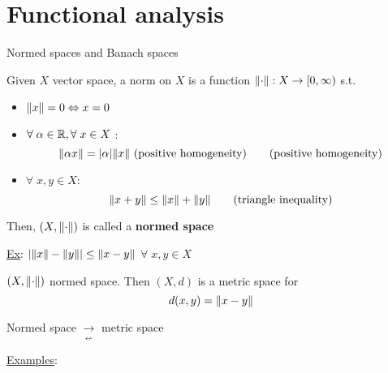 \section*{Functional analysis}
Normed spaces and Banach spaces
\begin{definition}
    Given \(X\) vector space, a norm on \(X\) is a function \(\norm{\cdot} : X \to [0, \infty)\) s.t.
    \begin{itemize}
        \item \(\norm{x} = 0 \Leftrightarrow x = 0\)
        \item \(\forall \; \alpha \in \mathbb{R}, \forall \; x \in X\) : 
        \[
            \norm{\alpha x} = \abs{\alpha}\norm{x} \text{ (positive homogeneity)} \tag*{(positive homogeneity)}
        \]
        \item \(\forall \; x,y \in X\): 
        \[
            \norm{x+y} \leq \norm{x} + \norm{y} \tag*{(triangle inequality)}
        \]
    \end{itemize}
    Then, \((X, \norm{\cdot})\) is called a \textbf{normed space}
\end{definition}
\underline{Ex}: \(\abs{\norm{x} - \norm{y}} \leq \norm{x - y}\) \(\forall \; x,y \in X\)
\begin{proposition}
    \((X, \norm{\cdot})\) normed space. Then \((X, d)\) is a metric space for 
    \[
        d(x,y) = \norm{x - y}
    \]
\end{proposition}
\begin{remark}
    Normed space \(\underset{\displaystyle\nleftarrow}{\rightarrow}\) metric space
\end{remark}
\underline{Examples}:

